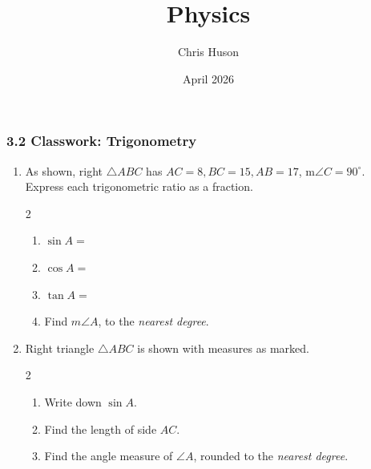 \documentclass[12pt, twoside]{article}
\title{Physics}
\author{Chris Huson}
\date{April 2026}
\begin{document}
\subsubsection*{3.2 Classwork: Trigonometry}

\begin{enumerate}
\item As shown, right $\triangle ABC$ has $AC=8, BC=15, AB=17$, m$\angle C=90^\circ$. \\[0.25cm] 
Express each trigonometric ratio as a fraction.
  \begin{multicols}{2}
    \begin{enumerate}[itemsep=0cm]
      \item $\sin A =$
      \item $\cos A =$
      \item $\tan A =$
      \item Find $m\angle A$, to the \emph{nearest degree}.
    \end{enumerate}
    \begin{center}
    \end{center}
  \end{multicols} \vspace{2cm}

\item Right triangle $\triangle ABC$ is shown with measures as marked.\vspace{0.25cm}
\begin{multicols}{2}
  \begin{enumerate}[itemsep=1cm]
    \item Write down $\sin A$.
    \item Find the length of side $AC$.\vspace{1.5cm}
    \item Find the angle measure of $\angle A$, rounded to the \emph{nearest degree}.
    \vspace{1cm}
  \end{enumerate}
\begin{flushright}
\end{flushright}
\end{multicols} \vspace{1cm}




\end{enumerate}
\end{document}
